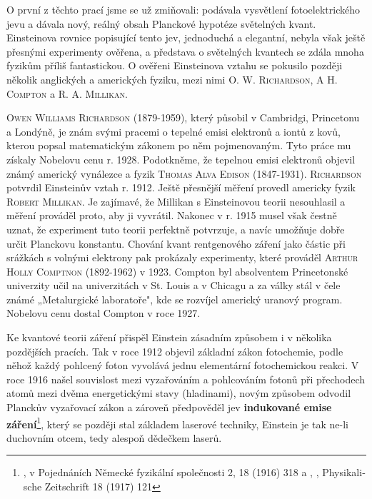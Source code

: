         O první z těchto prací jsme se už zmiňovali: podávala vysvětlení fotoelektrického jevu a
        dávala nový, reálný obsah Planckové hypotéze světelných kvant. Einsteinova rovnice
        popisující tento jev, jednoduchá a elegantní, nebyla však ještě přesnými experimenty
        ověřena, a představa o světelných kvantech se zdála mnoha fyzikům příliš fantastickou. O
        ověřeni Einsteinova vztahu se pokusilo později několik anglických a amerických fyziku, mezi
        nimi \textsc{O. W. Richardson}, \textsc{A H. Compton} a \textsc{R. A. Millikan}.

        \begin{tcnote}
          \textsc{Owen Williams Richardson} (1879-1959), který působil v Cambridgi, Princetonu a
          Londýně, je znám svými pracemi o tepelné emisi elektronů a iontů z kovů, kterou popsal
          matematickým zákonem po něm pojmenovaným. Tyto práce mu získaly Nobelovu cenu r. 1928.
          Podotkněme, že tepelnou emisi elektronů objevil známý americký vynálezce a fyzik
          \textsc{Thomas Alva Edison} (1847-1931). \textsc{Richardson} potvrdil Einsteinův vztah r.
          1912. Ještě přesnější měření provedl americky fyzik \textsc{Robert Millikan}. Je zajímavé,
          že Millikan s Einsteinovou teorii nesouhlasil a měření prováděl proto, aby ji vyvrátil.
          Nakonec v r. 1915 musel však čestně uznat, že experiment tuto teorii perfektně potvrzuje,
          a navíc umožňuje dobře určit Planckovu konstantu. Chování kvant rentgenového záření jako
          částic při srážkách s volnými elektrony pak prokázaly experimenty, které prováděl
          \textsc{Arthur Holly Comptnon} (1892-1962) v 1923. Compton byl absolventem Princetonské
          univerzity učil na univerzitách v St. Louis a v Chicagu a za války stál v čele známé
          „Metalurgické laboratoře", kde se rozvíjel americký uranový program. Nobelovu cenu dostal
          Compton v roce 1927.
        \end{tcnote}

        Ke kvantové teorii záření přispěl Einstein zásadním způsobem i v několika pozdějších
        pracích. Tak v roce 1912 objevil základní zákon fotochemie, podle něhož každý pohlcený foton
        vyvolává jednu elementární fotochemickou reakci. V roce 1916 našel souvislost mezi
        vyzařováním a pohlcováním fotonů při přechodech atomů mezi dvěma energetickými stavy
        (hladinami), novým způsobem odvodil Planckův vyzařovací zákon a zároveň předpověděl jev
        \textbf{indukované emise záření}\footnote{ , \foreignlanguage{ngerman}{} v Pojednáních Německé fyzikální společnosti 2, 18 (1916) 318 a , \foreignlanguage{ngerman}{,
        Physikalische Zeitschrift 18 (1917) 121}}, který se později stal základem laserové techniky,
        Einstein je tak ne-li duchovním otcem, tedy alespoň dědečkem laserů.

